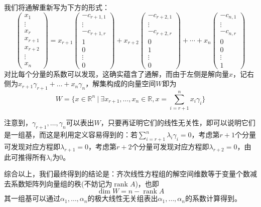 \documentclass[a4paper,UTF8,fontset=windows]{ctexart}
\DeclareMathOperator{\rank}{rank}
\begin{document}
我们将通解重新写为下方的形式：
$$\begin{pmatrix}x_1\\\vdots\\x_r\\x_{r+1}\\x_{r+2}\\\vdots\\x_n\end{pmatrix}=x_{r+1}\begin{pmatrix}-c_{r+1,1}\\\vdots\\-c_{r+1,r}\\1\\0\\\vdots\\0\end{pmatrix}+x_{r+2}\begin{pmatrix}-c_{r+2,1}\\\vdots\\-c_{r+2,r}\\0\\1\\\vdots\\0\end{pmatrix}+\cdots+x_n\begin{pmatrix}-c_{n,1}\\\vdots\\-c_{n,r}\\0\\0\\\vdots\\1\end{pmatrix}$$
对比每个分量的系数可以发现，这确实蕴含了通解，而由于左侧是解向量$x$，记右侧为$x_{r+1}\gamma_{r+1}+\dots+x_n\gamma_n$，解集构成的向量空间$W$即为
$$W=\bigg\{x\in\mathbb{R}^n\ \bigg|\ \exists x_{r+1},\dots,x_n\in\mathbb{R},x=\sum_{i=r+1}^nx_i\gamma_i\bigg\}$$

注意到，$\gamma_{r+1},\dots,\gamma_n$可以表出$W$，只要再证明它们的线性无关性，即可以说明它们是一组基，而这是利用定义容易得到的：若$\sum_{i=r+1}^n\lambda_i\gamma_i=0$，考虑第$r+1$个分量可发现对应方程即$\lambda_{r+1}=0$，考虑第$r+2$个分量可发现对应方程即$\lambda_{r+2}=0$，由此可推得所有$\lambda_i$为0。

综合以上，我们最终得到的结论是：齐次线性方程组的解空间维数等于变量个数减去系数矩阵列向量组的秩(不妨记为$\rank A$)，也即
$$\dim W=n-\rank A$$
其一组基可以通过$\alpha_1,\dots,\alpha_n$的极大线性无关组表出$\alpha_1,\dots,\alpha_n$的系数计算得到。


\
\end{document}
